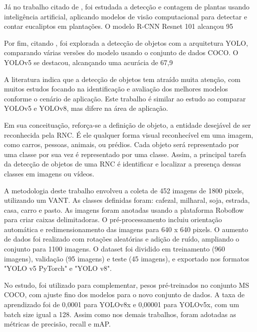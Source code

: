 Já no trabalho citado de \cite{silva2018detecccao}, foi estudada a detecção e contagem de plantas usando inteligência artificial, aplicando modelos de visão computacional para detectar e contar eucaliptos em plantações. O modelo R-CNN Resnet 101 alcançou 95%

Por fim, citando \cite{gomes2022detecccao}, foi explorada a detecção de objetos com a arquitetura YOLO, comparando várias versões do modelo usando o conjunto de dados COCO. O YOLOv5 se destacou, alcançando uma acurácia de 67,9%

A literatura indica que a detecção de objetos tem atraído muita atenção, com muitos estudos focando na identificação e avaliação dos melhores modelos conforme o cenário de aplicação. Este trabalho é similar ao estudo \cite{afonso2023vehicle} ao comparar YOLOv5 e YOLOv8, mas difere na área de aplicação.

Em sua conceituação, reforça-se a definição de objeto, a entidade desejável de ser reconhecida pela RNC. É ele qualquer forma visual reconhecível em uma imagem, como carros, pessoas, animais, ou prédios. Cada objeto será representado por uma classe por sua vez é representado por uma classe. Assim, a principal tarefa da detecção de objetos de uma RNC é identificar e localizar a presença dessas classes em imagens ou vídeos.

A metodologia deste trabalho envolveu a coleta de 452 imagens de 1800 pixels, utilizando um VANT. As classes definidas foram: cafezal, milharal, soja, estrada, casa, carro e pasto. As imagens foram anotadas usando a plataforma Roboflow para criar caixas delimitadoras. O pré-processamento incluiu orientação automática e redimensionamento das imagens para 640 x 640 pixels. O aumento de dados foi realizado com rotações aleatórias e adição de ruído, ampliando o conjunto para 1100 imagens. O dataset foi dividido em treinamento (960 imagens), validação (95 imagens) e teste (45 imagens), e exportado nos formatos "YOLO v5 PyTorch" e "YOLO v8".

No estudo, foi utilizado para complementar, pesos pré-treinados no conjunto MS COCO, com ajuste fino dos modelos para o novo conjunto de dados. A taxa de aprendizado foi de 0,0001 para YOLOv8x e 0,00001 para YOLOv5x, com um batch size igual a 128. Assim como nos demais trabalhos, foram adotadas as métricas de precisão, recall e mAP.

